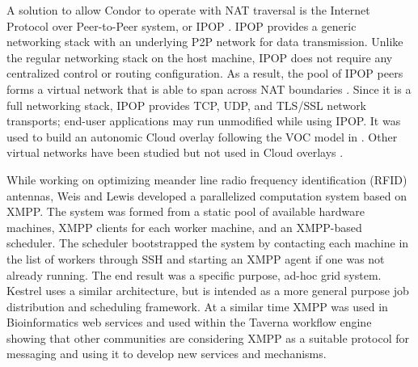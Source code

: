 A solution to allow Condor to operate with NAT traversal is the Internet
Protocol over Peer-to-Peer system, or IPOP \cite{Ganguly2006}. IPOP
provides a generic networking stack with an underlying P2P network
for data transmission. Unlike the regular networking stack on the
host machine, IPOP does not require any centralized control or routing
configuration. As a result, the pool of IPOP peers forms a virtual
network that is able to span across NAT boundaries \cite{Ganguly2006a}.
Since it is a full networking stack, IPOP provides TCP, UDP, and TLS/SSL
network transports; end-user applications may run unmodified while
using IPOP. It was used to build an autonomic Cloud overlay following
the VOC model in \cite{Abraham2010}. Other virtual networks have
been studied but not used in Cloud overlays \cite{Ruth2005,Tsugawa2006}.

While working on optimizing meander line radio frequency identification
(RFID) antennas, Weis and Lewis \cite{Weis2009} developed a parallelized
computation system based on XMPP. The system was formed from a static
pool of available hardware machines, XMPP clients for each worker
machine, and an XMPP-based scheduler. The scheduler bootstrapped the
system by contacting each machine in the list of workers through SSH
and starting an XMPP agent if one was not already running. The end
result was a specific purpose, ad-hoc grid system. Kestrel uses a
similar architecture, but is intended as a more general purpose job
distribution and scheduling framework. At a similar time XMPP was
used in Bioinformatics web services \cite{Wagener2009} and used within
the Taverna workflow engine \cite{Oinn2004} showing that other communities
are considering XMPP as a suitable protocol for messaging and using
it to develop new services and mechanisms.
